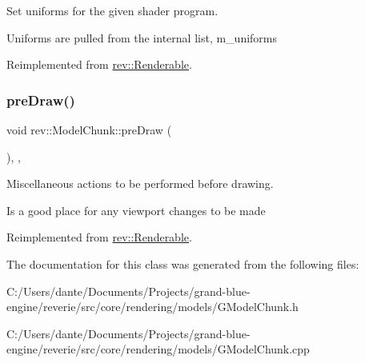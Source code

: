 Set uniforms for the given shader program. 

Uniforms are pulled from the internal list, m\+\_\+uniforms 

Reimplemented from \mbox{\hyperlink{classrev_1_1_renderable_abb193adc67d748cdc82c92084d13589b}{rev\+::\+Renderable}}.

\mbox{\label{classrev_1_1_model_chunk_a59831075966c33b791a59ab6a5f29937}} 
\subsubsection{\texorpdfstring{preDraw()}{preDraw()}}
{\footnotesize\ttfamily void rev\+::\+Model\+Chunk\+::pre\+Draw (\begin{DoxyParamCaption}{ }\end{DoxyParamCaption})\hspace{0.3cm}{\ttfamily [override]}, {\ttfamily [protected]}, {\ttfamily [virtual]}}



Miscellaneous actions to be performed before drawing. 

Is a good place for any viewport changes to be made 

Reimplemented from \mbox{\hyperlink{classrev_1_1_renderable_ac1fe33dec408d65bbae10e24fbedc6bc}{rev\+::\+Renderable}}.



The documentation for this class was generated from the following files\+:\begin{DoxyCompactItemize}
\item 
C\+:/\+Users/dante/\+Documents/\+Projects/grand-\/blue-\/engine/reverie/src/core/rendering/models/G\+Model\+Chunk.\+h\item 
C\+:/\+Users/dante/\+Documents/\+Projects/grand-\/blue-\/engine/reverie/src/core/rendering/models/G\+Model\+Chunk.\+cpp\end{DoxyCompactItemize}
